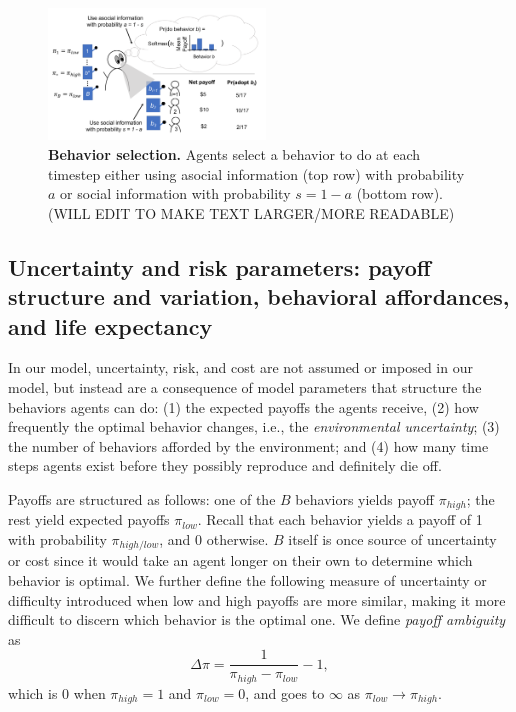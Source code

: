 \documentclass[10pt,letterpaper]{article}
\begin{document}
\begin{figure}
  \centering
  \caption{\textbf{Behavior selection.} 
    Agents select a behavior to do at each timestep either using asocial 
  information (top row) with probability $a$ or social information with
probability $s = 1 - a$ (bottom row). (WILL EDIT TO MAKE TEXT LARGER/MORE
READABLE)}
  \label{fig:behaviorSelection}
    \includegraphics[width=0.515\textwidth]{Figures/BehaviorSelection.pdf}
\end{figure}




\subsection{Uncertainty and risk parameters: payoff structure and variation, behavioral affordances, and life expectancy}

In our model, uncertainty, risk, and cost are not assumed or imposed in our model, 
but instead are a consequence of model parameters that structure the behaviors
agents can do: (1) the expected payoffs the agents receive, 
(2) how frequently the optimal behavior changes, i.e., the \emph{environmental
uncertainty}; (3) the number of behaviors 
afforded by the environment; and (4) how many time steps 
agents exist before they possibly reproduce and definitely die off.

Payoffs are structured as follows: 
one of the $B$ behaviors yields payoff $\pi_{high}$; the rest yield expected payoffs
$\pi_{low}$. Recall that each behavior yields a payoff of 1 with probability
$\pi_{high/low}$, and 0 otherwise. 
$B$ itself is once source of uncertainty or cost since it would
take an agent longer on their own to determine which behavior is optimal. 
We further define the following measure of uncertainty or difficulty introduced when
low and high payoffs are more similar, making it more difficult to discern which
behavior is the optimal one. We define \emph{payoff ambiguity} as
\begin{equation}
\Delta \pi = \frac{1}{\pi_{high} - \pi_{low}} - 1,
\end{equation}
which is 0 when $\pi_{high} = 1$
and $\pi_{low} = 0$, and goes to $\infty$ as $\pi_{low} \to \pi_{high}$.
\end{document}
